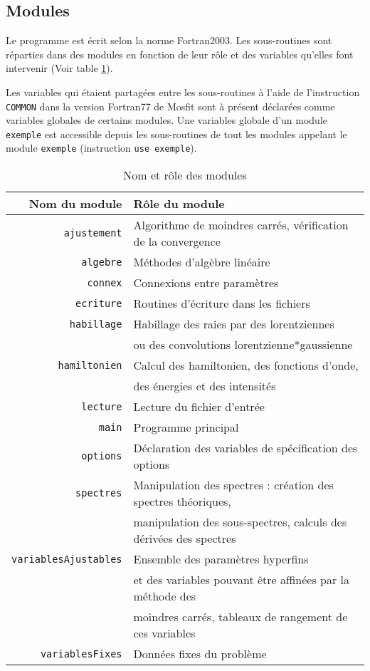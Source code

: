 \FloatBarrier
\subsection{Modules}
Le programme est écrit selon la norme Fortran2003. 
Les sous-routines sont réparties dans des modules en fonction de leur r\^ole
et des variables qu'elles font intervenir (Voir table \ref{tab:role_module}).

Les variables qui étaient partagées entre les sous-routines à l'aide de l'instruction \lstinline{COMMON} dans la version Fortran77 de Mosfit
sont à présent déclarées comme variables globales de certains modules.
Une variables globale d'un module \lstinline{exemple} est accessible depuis les sous-routines de tout les modules appelant le module \lstinline{exemple} (instruction \lstinline{use exemple}).

\begin{table}
\begin{tabular}{|r|l|}
\hline
Nom du module & R\^ole du module\\ \hline \hline
 \lstinline{ajustement} & Algorithme de moindres carrés, vérification de la convergence \\\hline
 \lstinline{algebre} & Méthodes d'algèbre linéaire\\\hline
 \lstinline{connex}	& Connexions entre paramètres \\\hline
 \lstinline{ecriture} &Routines d'écriture dans les fichiers\\\hline
 \lstinline{habillage} &Habillage des raies par des lorentziennes\\
          & ou des convolutions lorentzienne*gaussienne\\\hline
  \lstinline{hamiltonien} & Calcul des hamiltonien, des fonctions d'onde,\\
          & des énergies et des intensités \\\hline
 \lstinline{lecture} &Lecture du fichier d'entrée\\\hline
 \lstinline{main} & Programme principal \\ \hline
 \lstinline{options} & Déclaration des variables de spécification des options\\\hline
 \lstinline{spectres}	& Manipulation des spectres : création des spectres théoriques, \\
        &  manipulation des sous-spectres, calculs des dérivées des spectres\\\hline
 \lstinline{variablesAjustables} & Ensemble des paramètres hyperfins \\
      & et des variables pouvant être affinées par la méthode des \\
      &moindres carrés, tableaux de rangement de ces variables\\\hline
 \lstinline{variablesFixes}	& Données fixes du problème \\ \hline
\end{tabular}
\caption{\label{tab:role_module}Nom et rôle des modules}
\end{table}

